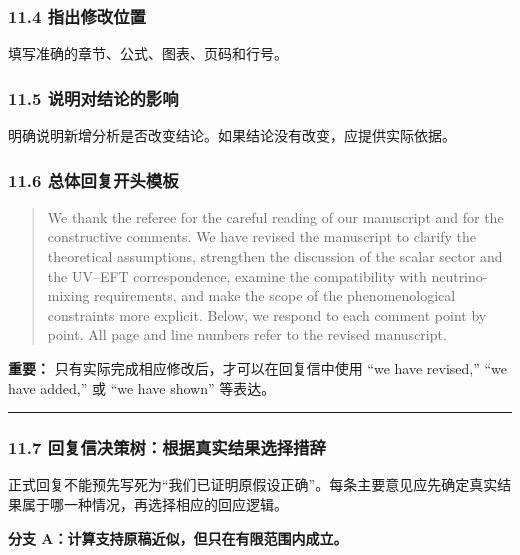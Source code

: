 \documentclass[
]{article}
\begin{document}
\subsubsection{11.4
指出修改位置}\label{ux6307ux51faux4feeux6539ux4f4dux7f6e}

填写准确的章节、公式、图表、页码和行号。

\subsubsection{11.5
说明对结论的影响}\label{ux8bf4ux660eux5bf9ux7ed3ux8bbaux7684ux5f71ux54cd}

明确说明新增分析是否改变结论。如果结论没有改变，应提供实际依据。

\subsubsection{11.6
总体回复开头模板}\label{ux603bux4f53ux56deux590dux5f00ux5934ux6a21ux677f}

\begin{quote}
We thank the referee for the careful reading of our manuscript and for
the constructive comments. We have revised the manuscript to clarify the
theoretical assumptions, strengthen the discussion of the scalar sector
and the UV--EFT correspondence, examine the compatibility with
neutrino-mixing requirements, and make the scope of the phenomenological
constraints more explicit. Below, we respond to each comment point by
point. All page and line numbers refer to the revised manuscript.
\end{quote}

\textbf{重要：} 只有实际完成相应修改后，才可以在回复信中使用 ``we have
revised,'' ``we have added,'' 或 ``we have shown'' 等表达。

\begin{center}\rule{0.5\linewidth}{0.5pt}\end{center}

\subsubsection{11.7
回复信决策树：根据真实结果选择措辞}\label{ux56deux590dux4fe1ux51b3ux7b56ux6811ux6839ux636eux771fux5b9eux7ed3ux679cux9009ux62e9ux63aaux8f9e}

正式回复不能预先写死为``我们已证明原假设正确''。每条主要意见应先确定真实结果属于哪一种情况，再选择相应的回应逻辑。

\textbf{分支 A：计算支持原稿近似，但只在有限范围内成立。}
\end{document}
